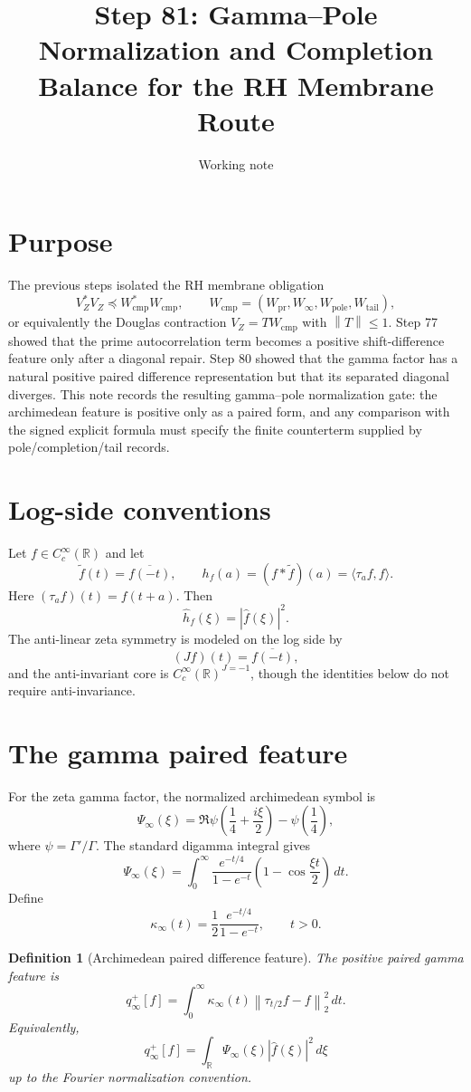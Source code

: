 \documentclass[11pt]{article}
\title{Step 81: Gamma--Pole Normalization and Completion Balance for the RH Membrane Route}
\author{Working note}
\date{}
\newtheorem{definition}{Definition}
\newcommand{\R}{\mathbb R}
\newcommand{\ip}[2]{\langle #1,#2\rangle}
\newcommand{\norm}[1]{\left\lVert #1\right\rVert}
\newcommand{\cmp}{\mathrm{cmp}}
\newcommand{\pr}{\mathrm{pr}}
\newcommand{\tail}{\mathrm{tail}}
\newcommand{\pole}{\mathrm{pole}}
\begin{document}
\maketitle

\section{Purpose}
The previous steps isolated the RH membrane obligation
\[
  V_Z^*V_Z\preceq W_{\cmp}^*W_{\cmp},
  \qquad
  W_{\cmp}=(W_{\pr},W_\infty,W_{\pole},W_{\tail}),
\]
or equivalently the Douglas contraction $V_Z=TW_{\cmp}$ with $\norm T\le1$.
Step 77 showed that the prime autocorrelation term becomes a positive shift-difference feature only after a diagonal repair. Step 80 showed that the gamma factor has a natural positive paired difference representation but that its separated diagonal diverges. This note records the resulting gamma--pole normalization gate: the archimedean feature is positive only as a paired form, and any comparison with the signed explicit formula must specify the finite counterterm supplied by pole/completion/tail records.

\section{Log-side conventions}
Let $f\in C_c^\infty(\R)$ and let
\[
  \widetilde f(t)=\overline{f(-t)},\qquad
  h_f(a)=(f*\widetilde f)(a)=\ip{\tau_a f}{f}.
\]
Here $(\tau_a f)(t)=f(t+a)$. Then
\[
  \widehat h_f(\xi)=|\widehat f(\xi)|^2.
\]
The anti-linear zeta symmetry is modeled on the log side by
\[
  (Jf)(t)=\overline{f(-t)},
\]
and the anti-invariant core is $C_c^\infty(\R)^{J=-1}$, though the identities below do not require anti-invariance.

\section{The gamma paired feature}
For the zeta gamma factor, the normalized archimedean symbol is
\[
  \Psi_\infty(\xi)
  =\Re\psi\!\left(\frac14+\frac{i\xi}{2}\right)-\psi\!\left(\frac14\right),
\]
where $\psi=\Gamma'/\Gamma$. The standard digamma integral gives
\[
  \Psi_\infty(\xi)=\int_0^\infty
  \frac{e^{-t/4}}{1-e^{-t}}\left(1-\cos\frac{\xi t}{2}\right)\,dt.
\]
Define
\[
  \kappa_\infty(t)=\frac12\frac{e^{-t/4}}{1-e^{-t}},\qquad t>0.
\]

\begin{definition}[Archimedean paired difference feature]
The positive paired gamma feature is
\[
  q_\infty^+[f]
  =\int_0^\infty \kappa_\infty(t)\norm{\tau_{t/2}f-f}_2^2\,dt.
\]
Equivalently,
\[
  q_\infty^+[f]=\int_\R \Psi_\infty(\xi)|\widehat f(\xi)|^2\,d\xi
\]
up to the Fourier normalization convention.
\end{definition}
\end{document}

